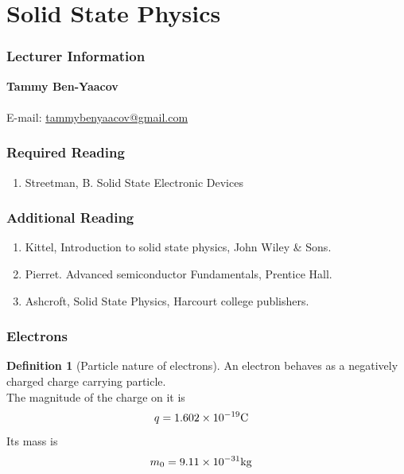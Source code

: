 \documentclass[fleqn, a4paper, 12pt, twoside]{article}
\theoremstyle{definition}
\newtheorem{definition}{Definition}
\theoremstyle{theorem}
\begin{document}
\newpage
\part{Solid State Physics}

\section{Lecturer Information}

\textbf{Tammy Ben-Yaacov}\\
~\\
E-mail: \href{mailto:tammybenyaacov@gmail.com}{tammybenyaacov@gmail.com}\\

\section{Required Reading}

\begin{enumerate}
	\item Streetman, B. Solid State Electronic Devices
\end{enumerate}

\section{Additional Reading}

\begin{enumerate}
	\item Kittel, Introduction to solid state physics, John Wiley \& Sons.
	\item Pierret. Advanced semiconductor Fundamentals, Prentice Hall.
	\item Ashcroft, Solid State Physics, Harcourt college publishers.
\end{enumerate}

\section{Electrons}

\begin{definition}[Particle nature of electrons]
	An electron behaves as a negatively charged charge carrying particle.\\
	The magnitude of the charge on it is
	\begin{align*}
		q & = 1.602 \times 10^{-19} \coulomb
	\end{align*}
	Its mass is
	\begin{align*}
		m_0 & = 9.11 \times 10^{-31} \kilogram
	\end{align*}
\end{definition}
\end{document}
